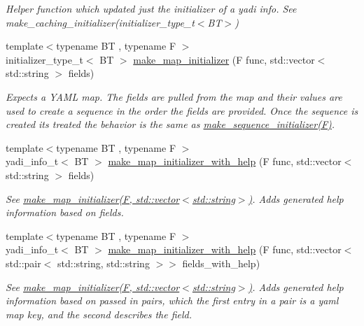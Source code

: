 \begin{DoxyCompactItemize}
\begin{DoxyCompactList}\small\item\em Helper function which updated just the initializer of a yadi info. See make\+\_\+caching\+\_\+initializer(initializer\+\_\+type\+\_\+t$<$\+B\+T$>$) \end{DoxyCompactList}\item 
{\footnotesize template$<$typename BT , typename F $>$ }\\initializer\+\_\+type\+\_\+t$<$ BT $>$ \hyperlink{namespaceyadi_a904dc2ee15dbdedd1b2dac4e0420fe15}{make\+\_\+map\+\_\+initializer} (F func, std\+::vector$<$ std\+::string $>$ fields)
\begin{DoxyCompactList}\small\item\em Expects a Y\+A\+ML map. The fields are pulled from the map and their values are used to create a sequence in the order the fields are provided. Once the sequence is created it\textquotesingle{}s treated the behavior is the same as \hyperlink{namespaceyadi_ac81e360a765ce7e454fa3971f1f06cdd}{make\+\_\+sequence\+\_\+initializer(\+F)}. \end{DoxyCompactList}\item 
{\footnotesize template$<$typename BT , typename F $>$ }\\yadi\+\_\+info\+\_\+t$<$ BT $>$ \hyperlink{namespaceyadi_ad3b75d9038a0e5b77482456af2311b0d}{make\+\_\+map\+\_\+initializer\+\_\+with\+\_\+help} (F func, std\+::vector$<$ std\+::string $>$ fields)
\begin{DoxyCompactList}\small\item\em See \hyperlink{namespaceyadi_a904dc2ee15dbdedd1b2dac4e0420fe15}{make\+\_\+map\+\_\+initializer(\+F, std\+::vector$<$std\+::string$>$)}. Adds generated help information based on fields. \end{DoxyCompactList}\item 
{\footnotesize template$<$typename BT , typename F $>$ }\\yadi\+\_\+info\+\_\+t$<$ BT $>$ \hyperlink{namespaceyadi_acc00952238c78dc6fbfc89bfe6deb8ee}{make\+\_\+map\+\_\+initializer\+\_\+with\+\_\+help} (F func, std\+::vector$<$ std\+::pair$<$ std\+::string, std\+::string $>$$>$ fields\+\_\+with\+\_\+help)
\begin{DoxyCompactList}\small\item\em See \hyperlink{namespaceyadi_a904dc2ee15dbdedd1b2dac4e0420fe15}{make\+\_\+map\+\_\+initializer(\+F, std\+::vector$<$std\+::string$>$)}. Adds generated help information based on passed in pairs, which the first entry in a pair is a yaml map key, and the second describes the field. \end{DoxyCompactList}\item 
$$
\end{DoxyCompactItemize}
